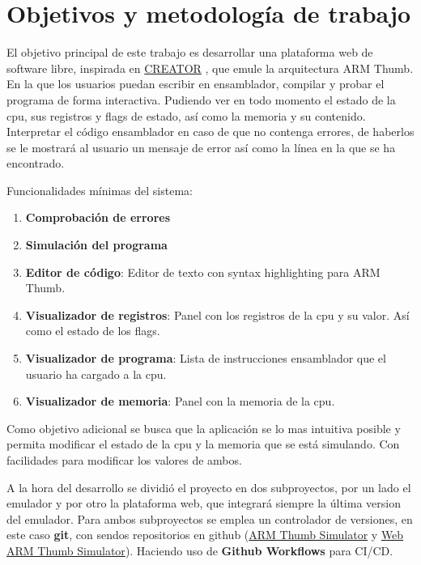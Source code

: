 \section{Objetivos y metodología de trabajo}
{
    El objetivo principal de este trabajo es desarrollar una plataforma web de software libre, inspirada en \href{https://creatorsim.github.io/creator/}{CREATOR} , que emule la arquitectura ARM Thumb. En la que los usuarios puedan escribir en ensamblador, compilar y probar el programa de forma interactiva.
    Pudiendo ver en todo momento el estado de la cpu, sus registros y flags de estado, así como la memoria y su contenido. \\

    Interpretar el código ensamblador en caso de que no contenga errores, de haberlos se le mostrará al usuario un mensaje de error así como la línea en la que se ha encontrado. 
    
    Funcionalidades mínimas del sistema:
    \begin{enumerate}
        \item \textbf{Comprobación de errores}
        \item \textbf{Simulación del programa}
        \item \textbf{Editor de código}: Editor de texto con syntax highlighting para ARM Thumb.
        \item \textbf{Visualizador de registros}: Panel con los registros de la cpu y su valor. Así como el estado de los flags.
        \item \textbf{Visualizador de programa}: Lista de instrucciones ensamblador que el usuario ha cargado a la cpu.
        \item \textbf{Visualizador de memoria}: Panel con la memoria de la cpu.
    \end{enumerate}

    Como objetivo adicional se busca que la aplicación se lo mas intuitiva posible y permita modificar el estado de la cpu y la memoria que se está simulando. Con facilidades para modificar los valores de ambos. \\
    \clearpage

    A la hora del desarrollo se dividió el proyecto en dos subproyectos, por un lado el emulador y por otro la plataforma web, que integrará siempre la última version del emulador.
    Para ambos subproyectos se emplea un controlador de versiones, en este caso \textbf{git}, con sendos repositorios en github (\href{https://github.com/FreddyJS/armthumb-emul}{ARM Thumb Simulator} y \href{https://github.com/FreddyJS/wthumb}{Web ARM Thumb Simulator}).
    Haciendo uso de \textbf{Github Workflows} para CI/CD. \\

}
